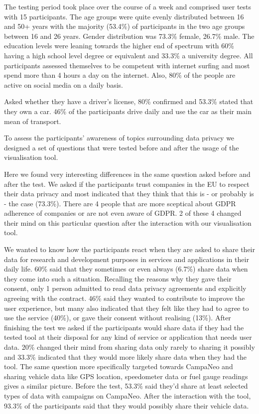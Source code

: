 \documentclass[../paper.tex]{subfiles}
\begin{document}
  The testing period took place over the course of a week and comprised user tests with 15 participants.
  The age groups were quite evenly distributed between 16 and 50+ years with the majority (53.4\%) of participants in the two age groups between 16 and 26 years.
  Gender distribution was 73.3\% female, 26.7\% male. The education levels were leaning towards the higher end of spectrum with 60\% having a high school level degree or equivalent and 33.3\% a university degree.
  All participants assessed themselves to be competent with internet surfing and most spend more than 4 hours a day on the internet. Also, 80\% of the people are active on social media on a daily basis.
  
  Asked whether they have a driver's license, 80\% confirmed and 53.3\% stated that they own a car. 46\% of the participants drive daily and use the car as their main mean of transport.
  
  To assess the participants' awareness of topics surrounding data privacy we designed a set of questions that were tested before and after the usage of the visualisation tool.
  
  Here we found very interesting differences in the same question asked before and after the test.
  We asked if the participants trust companies in the EU to respect their data privacy and most indicated that they think that this is - or probably is - the case (73.3\%).
  There are 4 people that are more sceptical about GDPR adherence of companies or are not even aware of GDPR. 2 of these 4 changed their mind on this particular question after the interaction with our visualisation tool.
  
  We wanted to know how the participants react when they are asked to share their data for research and development purposes in services and applications in their daily life.
  60\% said that they sometimes or even always (6.7\%) share data when they come into such a situation.
  Recalling the reasons why they gave their consent, only 1 person admitted to read data privacy agreements and explicitly agreeing with the contract.
  46\% said they wanted to contribute to improve the user experience, but many also indicated that they felt like they had to agree to use the service (40\%), or gave their consent without realising (13\%).
  After finishing the test we asked if the participants would share data if they had the tested tool at their disposal for any kind of service or application that needs user data. 20\% changed their mind from sharing data only rarely to sharing it possibly and 33.3\% indicated that they would more likely share data when they had the tool.
  The same question more specifically targeted towards CampaNeo and sharing vehicle data like GPS location, speedometer data or fuel gauge readings gives a similar picture.
  Before the test, 53.3\% said they'd share at least selected types of data with campaigns on CampaNeo. After the interaction with the tool, 93.3\% of the participants said that they would possibly share their vehicle data. 
  
  
  
\end{document}
